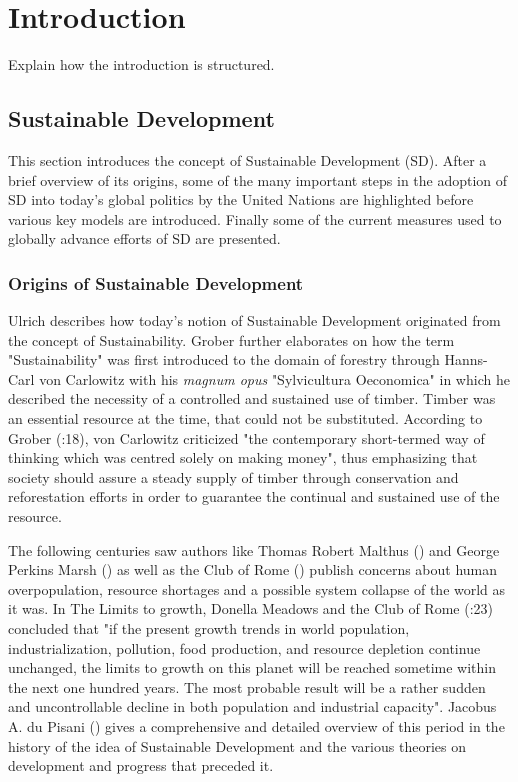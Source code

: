 	
	\section{Introduction}
	
	Explain how the introduction is structured.
		
		\subsection{Sustainable Development}
    		This section introduces the concept of Sustainable Development (SD). After a brief overview of its origins, some of the many important steps in the adoption of SD into today's global politics by the United Nations are highlighted before various key models are introduced. Finally some of the current measures used to globally advance efforts of SD are presented.
		
		    \subsubsection{Origins of Sustainable Development}
		        Ulrich \citet{grober2007} describes how today's notion of Sustainable Development originated from the concept of Sustainability. Grober further elaborates on how the term "Sustainability" was first introduced to the domain of forestry through Hanns-Carl von Carlowitz \citet{voncarlowitz1732} with his \textit{magnum opus} "Sylvicultura Oeconomica" in which he described the necessity of a controlled and sustained use of timber. Timber was an essential resource at the time, that could not be substituted. According to Grober (\citeyear{grober2007}:18), von Carlowitz criticized "the contemporary short-termed way of thinking which was centred solely on making money", thus emphasizing that society should assure a steady supply of timber through conservation and reforestation efforts in order to guarantee the continual and sustained use of the resource.
		        \medskip
		        
		        The following centuries saw authors like Thomas Robert Malthus (\citeyear{malthus1926}) and George Perkins Marsh (\citeyear{marsh1965}) as well as the Club of Rome (\citeyear{meadows1972a}) publish concerns about human overpopulation, resource shortages and a possible system collapse of the world as it was. In The Limits to growth, Donella Meadows and the Club of Rome (\citeyear{meadows1972a}:23) concluded that "if the present growth trends in world population, industrialization, pollution, food production, and resource depletion continue unchanged, the limits to growth on this planet will be reached sometime within the next one hundred years. The most probable result will be a rather sudden and uncontrollable decline in both population and industrial capacity". Jacobus A. du Pisani (\citeyear{dupisani2006}) gives a comprehensive and detailed overview of this period in the history of the idea of Sustainable Development and the various theories on development and progress that preceded it.
		        \medskip
		        
